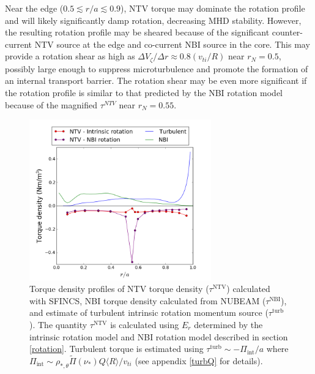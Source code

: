 \documentclass[aip, pop, preprint]{revtex4-1}
\numberwithin{figure}{section}
\numberwithin{equation}{section}
\begin{document}
Near the edge ($0.5 \lesssim r/a \lesssim 0.9$), NTV torque may dominate the rotation profile and will likely significantly damp rotation, decreasing MHD stability. However, the resulting rotation profile may be sheared because of the significant counter-current NTV source at the edge and co-current NBI source in the core. This may provide a rotation shear as high as $\Delta V_{\zeta}/ \Delta r \approx 0.8 (v_{ti}/R)$ near $r_N = 0.5$, possibly large enough to suppress microturbulence\cite{Hahm1994} and promote the formation of an internal transport barrier. The rotation shear may be even more significant if the rotation profile is similar to that predicted by the NBI rotation model because of the magnified $\tau^{NTV}$ near $r_N = 0.55$. 

\begin{figure}[h!]
\centering
\includegraphics[width=0.7\textwidth]{AllTorquePlot.png}
\caption{\label{fig:alltorque} Torque density profiles of NTV torque density ($\tau^{\text{NTV}}$) calculated with SFINCS, NBI torque density calculated from NUBEAM ($\tau^{\text{NBI}}$), and estimate of turbulent intrinsic rotation momentum source ($\tau^{\text{turb}}$). The quantity $\tau^{\text{NTV}}$ is calculated using $E_r$ determined by the intrinsic rotation model and NBI rotation model described in section \ref{rotation}. Turbulent torque is estimated using $\tau^{\text{turb}} \sim -\Pi_{\text{int}}/a$ where $\Pi_{\text{int}} \sim \rho_{*, \theta} \widetilde{\Pi}(\nu_*) Q \langle R \rangle/v_{ti}$ (see appendix \ref{turbQ} for details).}
\end{figure}

\FloatBarrier
\end{document}
